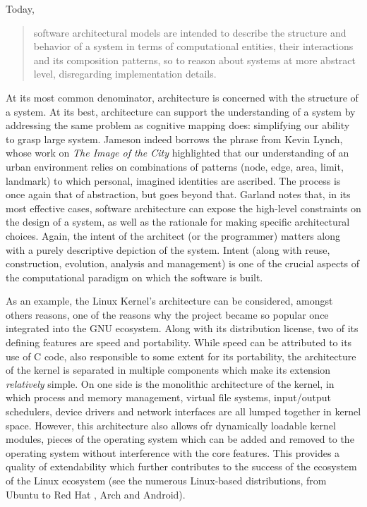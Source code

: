 \documentclass{article}
\begin{document}
Today, 
\begin{quote}
  software architectural models are intended to describe the structure and behavior of a system in terms of computational entities, their interactions and its composition patterns, so to reason about systems at more abstract  level, disregarding implementation details.\cite{garland_software_2000}
\end{quote}

At its most common denominator, architecture is concerned with the structure of a system. At its best, architecture can support the understanding of a system by addressing the same problem as cognitive mapping does: simplifying our ability to grasp large system. Jameson indeed borrows the phrase from Kevin Lynch, whose work on \emph{The Image of the City} highlighted that our understanding of an urban environment relies on combinations of patterns (node, edge, area, limit, landmark) to which personal, imagined identities are ascribed. The process is once again that of abstraction, but goes beyond that. Garland notes that, in its most effective cases, software architecture can expose the high-level constraints on the design of a system, as well as the rationale for making specific architectural choices. Again, the intent of the architect (or the programmer) matters along with a purely descriptive depiction of the system. Intent (along with reuse, construction, evolution, analysis and management) is one of the crucial aspects of the computational paradigm on which the software is built.

As an example, the Linux Kernel's architecture can be considered, amongst others reasons, one of the reasons why the project became so popular once integrated into the GNU ecosystem. Along with its distribution license, two of its defining features are speed and portability. While speed can be attributed to its use of C code, also responsible to some extent for its portability, the architecture of the kernel is separated in multiple components which make its extension \emph{relatively} simple. On one side is the monolithic architecture of the kernel, in which process and memory management, virtual file systems, input/output schedulers, device drivers and network interfaces are all lumped together in kernel space. However, this architecture also allows ofr dynamically loadable kernel modules, pieces of the operating system which can be added and removed to the operating system without interference with the core features. This provides a quality of extendability which further contributes to the success of the ecosystem of the Linux ecosystem (see the numerous Linux-based distributions, from Ubuntu to Red Hat , Arch and Android).
\end{document}
